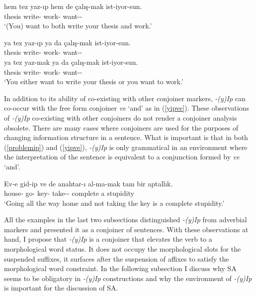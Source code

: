 \begin{exe}
\ex \label{problemip} 
\begin{xlist}
\ex \gll hem tez yaz-ıp hem de çalış-mak ist-iyor-sun. \\ 
{\Foc} thesis write-{\Pc} {\Foc} {\Ptcp} work-{\Nmlz} want-{\Prog}-{\Ssg} \\
\glt `(You) want to both write your thesis and work.'

\ex \gll *ya tez yaz-ıp ya da çalış-mak ist-iyor-sun. \\ 
{\Foc} thesis write-{\Pc} {\Foc} {\Ptcp} work-{\Nmlz} want-{\Prog}-{\Ssg} \\

\ex \gll ya tez yaz-mak ya da çalış-mak ist-iyor-sun. \\  
{\Foc} thesis write-{\Nmlz} {\Foc} {\Ptcp} work-{\Nmlz} want-{\Prog}-{\Ssg} \\
\glt `You either want to write your thesis or you want to work.'
\end{xlist}
\end{exe}


In addition to its ability of co-existing with other conjoiner markers, \textit{-(y)Ip} can co-occur with the free form conjoiner \textit{ve} `and' as in (\ref{yipve}). These observations of \textit{-(y)Ip} co-existing with other conjoiners do not render a conjoiner analysis obsolete. There are many cases where conjoiners are used for the purposes of changing information structure in a sentence. What is important is that in both (\ref{problemip}) and (\ref{yipve}), \textit{-(y)Ip} is only grammatical in an environment where the interpretation of the sentence is equivalent to a conjunction formed by \textit{ve} `and'.

\begin{exe}
    \ex \label{yipve}
    \gll Ev-e gid-ip ve de anahtar-ı al-ma-mak tam bir aptallık. \\ 
    house-{\Dat} go-{\Pc} {\And} {\Foc} key-{\Acc} take-{\Neg}-{\Nmlz} complete a stupidity \\
    \glt `Going all the way home and not taking the key is a complete stupidity.'
\end{exe}


All the examples in the last two subsections distinguished \textit{-(y)Ip} from adverbial markers and presented it as a conjoiner of sentences. With these observations at hand, I propose that \textit{-(y)Ip} is a conjoiner that elevates the verb to a morphological word status. It does not occupy the morphological slots for the suspended suffixes, it surfaces after the suspension of affixes to satisfy the morphological word constraint. In the following subsection I discuss why SA seems to be obligatory in \textit{-(y)Ip} constructions and why the environment of \textit{-(y)Ip} is important for the discussion of SA.


